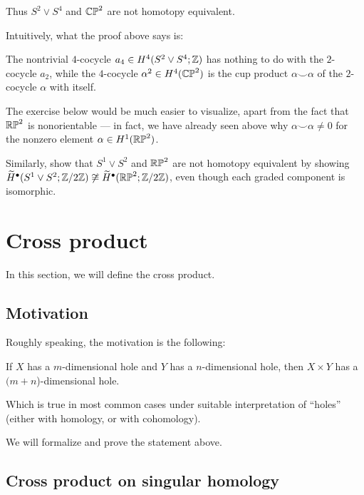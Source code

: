 Thus $S^2 \vee S^4$ and $\mathbb{CP}^2$ are not homotopy equivalent.

Intuitively, what the proof above says is:
\begin{moral}
	The nontrivial $4$-cocycle $a_4 \in H^4(S^2 \vee S^4; \mathbb Z)$
	has nothing to do with the $2$-cocycle $a_2$,
	while the $4$-cocycle $\alpha^2 \in H^4(\mathbb{CP}^2)$ is the cup product $\alpha
	\smile \alpha$ of the $2$-cocycle $\alpha$ with itself.
\end{moral}

The exercise below would be much easier to visualize, apart from the fact that $\mathbb{RP}^2$ is
nonorientable --- in fact, we have already seen
above why $\alpha \smile \alpha \neq 0$ for the nonzero element $\alpha \in H^1(\mathbb{RP}^2)$.

\begin{exercise}
	Similarly, show that $S^1 \vee S^2$ and $\mathbb{RP}^2$ are not homotopy equivalent by showing
	$\widetilde H^\bullet(S^1 \vee S^2; \mathbb Z/2\mathbb Z) \not\cong \widetilde H^\bullet(\mathbb{RP}^2; \mathbb Z/2\mathbb Z)$,
	even though each graded component is isomorphic.
\end{exercise}

\section{Cross product}

In this section, we will define the cross product.

\subsection{Motivation}

Roughly speaking, the motivation is the following:
\begin{moral}
	If $X$ has a $m$-dimensional hole and $Y$ has a $n$-dimensional hole, then $X \times Y$ has a
	$(m + n$)-dimensional hole.
\end{moral}
Which is true in most common cases under suitable interpretation of ``holes''
(either with homology, or with cohomology).

We will formalize and prove the statement above.

\subsection{Cross product on singular homology}

